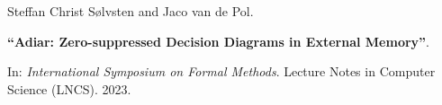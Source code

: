 Steffan Christ Sølvsten and Jaco van de Pol.

{\bf ``Adiar: Zero-suppressed Decision Diagrams in External Memory''}.

In: \emph{International Symposium on Formal Methods}. Lecture Notes in Computer
Science (LNCS). 2023.

